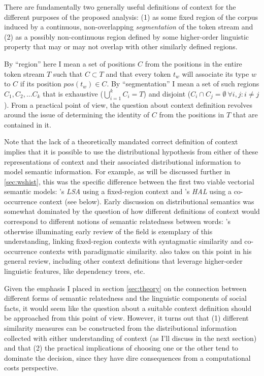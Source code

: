 There are fundamentally two generally useful definitions of context for the different purposes of the proposed analysis: (1) as some fixed region of the corpus induced by a continuous, non-overlapping \emph{segmentation} of the token stream and (2) as a possibly non-continuous region defined by some higher-order linguistic property that may or may not overlap with other similarly defined regions.

By ``region'' here I mean a set of positions $C$ from the positions in the entire token stream $T$ such that $C \subset T$ and that every token $t_w$ will associate its type $w$ to $C$ if its position $pos( t_w ) \in C$.
By ``segmentation'' I mean a set of such regions $C_1, C_2, ... C_k$ that is exhaustive ($\bigcup_{i=1}^k C_{i} = T$) and disjoint ($ C_i \cap C_j = \emptyset\ \forall i,j : i \neq j$).
From a practical point of view, the question about context definition revolves around the issue of determining the identity of $C$ from the positions in $T$ that are contained in it.

Note that the lack of a theoretically mandated correct definition of context implies that it is possible to use the distributional hypothesis from either of these representations of context and their associated distributional information to model semantic information.
For example, as will be discussed further in \autoref{sec:wshist}, this was the specific difference between the first two viable vectorial semantic models: \citeauthor{landauer1997}'s \emph{LSA} using a fixed-region context and \citeauthor{lund1996}'s \emph{HAL} using a co-occurrence context (see below).
Early discussion on distributional semantics was somewhat dominated by the question of how different definitions of context would correspond to different notions of semantic relatedness between words: \citeauthor{sahlgren2006}'s otherwise illuminating early review of the field is exemplary of this understanding, linking fixed-region contexts with syntagmatic similarity and co-occurrence contexts with paradigmatic similarity.
\citet{turney2010} also takes on this point in his general review, including other context definitions that leverage higher-order linguistic features, like dependency trees, etc.

Given the emphasis I placed in section \ref{sec:theory} on the connection between different forms of semantic relatedness and the linguistic components of social facts, it would seem like the question about a suitable context definition should be approached from this point of view.
However, it turns out that (1) different similarity measures can be constructed from the distributional information collected with either understanding of context (as I'll discuss in the next section) and that (2) the practical implications of choosing one or the other tend to dominate the decision, since they have dire consequences from a computational costs perspective.

